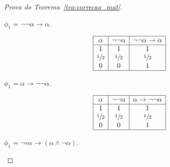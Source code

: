 \begin{proof}[Prova do Teorema~\ref{teo:correcao_mat}]
\begin{provaporcasos}
\begin{provaporsubcasos}
                    
                    \subcasodeprova{} $\phi_{1} = \neg \neg \alpha \to \alpha$. 

                    \begin{center}
                        \[
                            \begin{array}{|c|c|c|}%
                                \hline%
                                \alpha      & \neg \neg \alpha & \neg \neg \alpha \to \alpha \\
                                \hline%
                                1 & 1 & 1\\
                                \meio{} & \meio{} & \meio{}\\
                                0 & 0 & 1\\
                                \hline%
                            \end{array}
                        \]
                    \end{center}
                        
                    
                    \subcasodeprova{} $\phi_{1} = \alpha \to \neg \neg \alpha$. 
                    
                    \begin{center}
                        \[
                            \begin{array}{|c|c|c|}%
                                \hline%
                                \alpha      & \neg \neg \alpha &  \alpha \to \neg \neg \alpha\\
                                \hline%
                                1 & 1 & 1\\
                                \meio{} & \meio{} & \meio{}\\
                                0 & 0 & 1\\
                                \hline%
                            \end{array}
                        \]
                    \end{center}
                    
                    
                    \subcasodeprova{} $\phi_{1} = \neg \circ \alpha \to (\alpha \land \neg \alpha)$. 


\end{provaporsubcasos}
\end{provaporcasos}
\end{proof}
